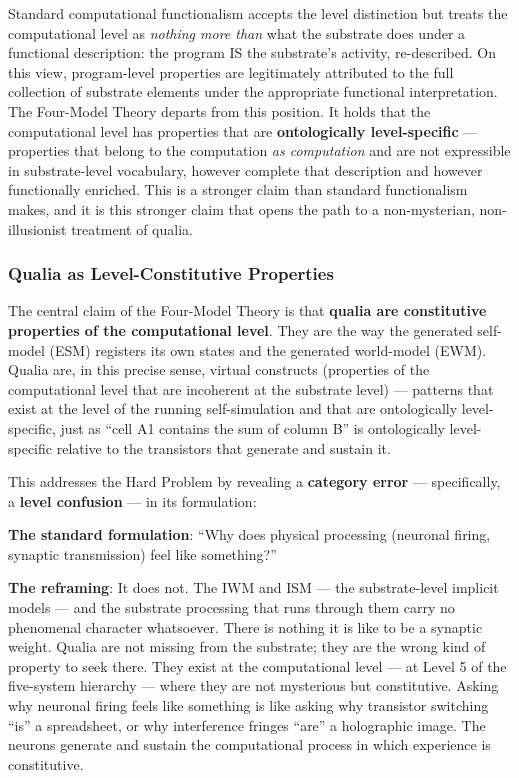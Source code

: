 \documentclass[12pt]{article}
\begin{document}
Standard computational functionalism \citep{Putnam1967,Chalmers1996} accepts the level distinction but treats the computational level as \emph{nothing more than} what the substrate does under a functional description: the program IS the substrate's activity, re-described. On this view, program-level properties are legitimately attributed to the full collection of substrate elements under the appropriate functional interpretation. The Four-Model Theory departs from this position. It holds that the computational level has properties that are \textbf{ontologically level-specific} --- properties that belong to the computation \emph{as computation} and are not expressible in substrate-level vocabulary, however complete that description and however functionally enriched. This is a stronger claim than standard functionalism makes, and it is this stronger claim that opens the path to a non-mysterian, non-illusionist treatment of qualia.


\subsubsection{Qualia as Level-Constitutive Properties}


The central claim of the Four-Model Theory is that \textbf{qualia are constitutive properties of the computational level}. They are the way the generated self-model (ESM) registers its own states and the generated world-model (EWM). Qualia are, in this precise sense, virtual constructs (properties of the computational level that are incoherent at the substrate level) --- patterns that exist at the level of the running self-simulation and that are ontologically level-specific, just as ``cell A1 contains the sum of column B'' is ontologically level-specific relative to the transistors that generate and sustain it.

This addresses the Hard Problem by revealing a \textbf{category error} --- specifically, a \textbf{level confusion} --- in its formulation:

\textbf{The standard formulation}: ``Why does physical processing (neuronal firing, synaptic transmission) feel like something?''

\textbf{The reframing}: It does not. The IWM and ISM --- the substrate-level implicit models --- and the substrate processing that runs through them carry no phenomenal character whatsoever. There is nothing it is like to be a synaptic weight. Qualia are not missing from the substrate; they are the wrong kind of property to seek there. They exist at the computational level --- at Level 5 of the five-system hierarchy --- where they are not mysterious but constitutive. Asking why neuronal firing feels like something is like asking why transistor switching ``is'' a spreadsheet, or why interference fringes ``are'' a holographic image. The neurons generate and sustain the computational process in which experience is constitutive.
\end{document}
